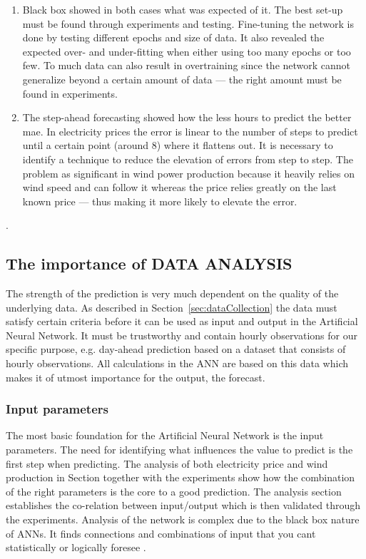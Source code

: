 \begin{enumerate}
\item Black box showed in both cases what was expected of it. The best set-up must be found through experiments and testing. Fine-tuning the network is done by testing different epochs and size of data. It also revealed the expected over- and under-fitting when either using too many epochs or too few. To much data can also result in overtraining since the network cannot generalize beyond a certain amount of data --- the right amount must be found in experiments. 
\item The step-ahead forecasting showed how the less hours to predict the better mae. In electricity prices the error is linear to the number of steps to predict until a certain point (around 8) where it flattens out. It is necessary to identify a technique to reduce the elevation of errors from step to step. The problem as significant in wind power production because it heavily relies on wind speed and can follow it whereas the price relies greatly on the last known price --- thus making it more likely to elevate the error. 
\end{enumerate}

.

\subsection{The importance of DATA ANALYSIS}
The strength of the prediction is very much dependent on the quality of the underlying data. As described in Section~\ref{sec:dataCollection} the data must satisfy certain criteria before it can be used as input and output in the Artificial Neural Network. It must be trustworthy and contain hourly observations for our specific purpose, e.g. day-ahead prediction based on a dataset that consists of hourly observations. All calculations in the ANN are based on this data which makes it of utmost importance for the output, the forecast.

\subsubsection{Input parameters}
The most basic foundation for the Artificial Neural Network is the input parameters. The need for identifying what influences the value to predict is the first step when predicting. The analysis of both electricity price and wind production in Section together with the experiments show how the combination of the right parameters is the core to a good prediction. The analysis section establishes the co-relation between input/output which is then validated through the experiments. Analysis of the network is complex due to the black box nature of ANNs. It finds connections and combinations of input that you cant statistically or logically foresee .

